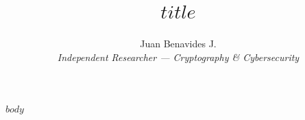 \documentclass[journal]{IEEEtran}
\title{$title$}
\author{Juan Benavides J.\\
\textit{Independent Researcher --- Cryptography \& Cybersecurity}}
\begin{document}
\maketitle

$body$
\end{document}
